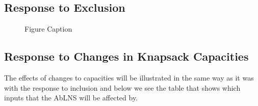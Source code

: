 \subsection{Response to Exclusion}
\begin{figure}[H]
	\centering

	\resizebox{\linewidth}{!}{
		
	}
	\caption{Figure Caption}
	\label{fig:objective-exclusion-400}
\end{figure}

\subsection{Response to Changes in Knapsack Capacities}
The effects of changes to capacities will be illustrated in the same way as it was with the response to inclusion and below we see the table that shows which inputs that the AbLNS will be affected by.

